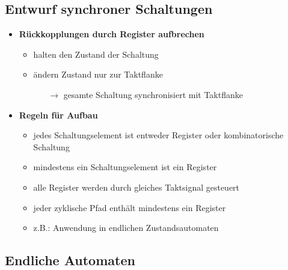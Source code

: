  
\subsection{Entwurf synchroner Schaltungen}

\begin{itemize}

\item \textbf{Rückkopplungen durch Register aufbrechen}
	\begin{itemize}
	\item halten den Zustand der Schaltung
	\item ändern Zustand nur zur Taktflanke
		\begin{itemize}
		\item[$\rightarrow$] gesamte Schaltung synchronisiert mit Taktflanke
		\end{itemize}
	
	\end{itemize}

\item \textbf{Regeln für Aufbau}
	\begin{itemize}
	\item jedes Schaltungselement ist entweder Register oder kombinatorische Schaltung
	\item mindestens ein Schaltungselement ist ein Register
	\item alle Register werden durch gleiches Taktsignal gesteuert
	\item jeder zyklische Pfad enthält mindestens ein Register
	\item z.B.: Anwendung in endlichen Zustandsautomaten
	\end{itemize}	 


\end{itemize}

\subsection{Endliche Automaten}

